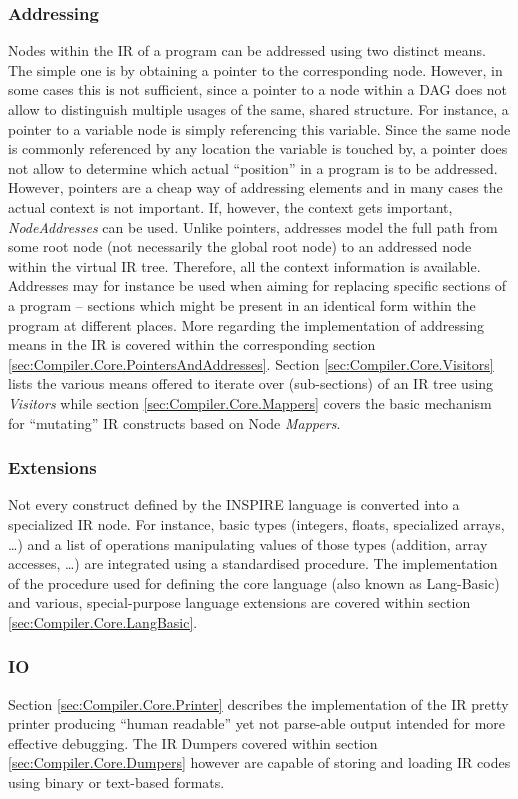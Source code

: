 \subsubsection{Addressing}
Nodes within the IR of a program can be addressed using two distinct means. The
simple one is by obtaining a pointer to the corresponding node. However, in some
cases this is not sufficient, since a pointer to a node within a DAG does not
allow to distinguish multiple usages of the same, shared structure. For
instance, a pointer to a variable node is simply referencing this variable.
Since the same node is commonly referenced by any location the variable is
touched by, a pointer does not allow to determine which actual ``position'' in a
program is to be addressed. However, pointers are a cheap way of addressing
elements and in many cases the actual context is not important. If, however, the
context gets important, \textit{NodeAddresses} can be used. Unlike pointers,
addresses model the full path from some root node (not necessarily the global
root node) to an addressed node within the virtual IR tree. Therefore, all the
context information is available. Addresses may for instance be used when aiming
for replacing specific sections of a program -- sections which might be present
in an identical form within the program at different places. More regarding the
implementation of addressing means in the IR is covered within the corresponding
section \ref{sec:Compiler.Core.PointersAndAddresses}. Section
\ref{sec:Compiler.Core.Visitors} lists the various means offered to iterate over
(sub-sections) of an IR tree using \textit{Visitors} while section
\ref{sec:Compiler.Core.Mappers} covers the basic mechanism for ``mutating'' IR
constructs based on Node \textit{Mappers}.

\subsubsection{Extensions}
Not every construct defined by the INSPIRE language is converted into a
specialized IR node. For instance, basic types (integers,
floats, specialized arrays, \ldots) and a list of operations manipulating
values of those types (addition, array accesses, \ldots) are integrated using a
standardised procedure. The implementation of the procedure used for defining
the core language (also known as Lang-Basic) and various, special-purpose
language extensions are covered within section
\ref{sec:Compiler.Core.LangBasic}.

\subsubsection{IO}
Section \ref{sec:Compiler.Core.Printer} describes the implementation of the IR
pretty printer producing ``human readable'' yet not parse-able output intended
for more effective debugging. The IR Dumpers covered within section
\ref{sec:Compiler.Core.Dumpers} however are capable of storing and loading IR
codes using binary or text-based formats.

